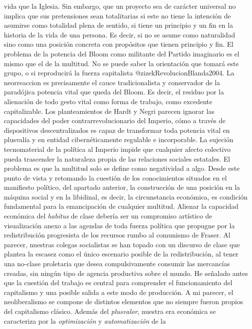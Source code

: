 \documentclass[
]{article}
\begin{document}
vida que la Iglesia. Sin embargo, que un proyecto sea de carácter
universal no implica que sus pretensiones sean totalitarias si este no
tiene la intención de asumirse como totalidad plena de sentido, si tiene
un principio y un fin en la historia de la vida de una persona. Es
decir, si no se asume como naturalidad sino como una posición concreta
con propósitos que tienen principio y fin. El problema de la potencia
del Bloom como militante del Partido imaginario es el mismo que el de la
multitud. No se puede saber la orientación que tomará este grupo, o si
reproducirá la fuerza capitalista @zizekRevolucionBlanda2004. La
neorreaccion es precisamente el cauce tradicionalista y conservador de
la paradójica potencia vital que queda del Bloom. Es decir, el residuo
por la alienación de todo gesto vital como forma de trabajo, como
excedente capitalizable. Los planteamientos de Hardt y Negri parecen
ignorar las capacidades del poder contrarrevolucionario del Imperio,
cómo a través de dispositivos descentralizados es capaz de transformar
toda potencia vital en plusvalía y en entidad cibernéticamente regulable
e incorporable. La sujeción tecnomaterial de la política al Imperio
impide que cualquier afecto colectivo pueda trascender la naturaleza
propia de las relaciones sociales estatales. El problema es que la
multitud solo se define como negatividad a algo. Desde este punto de
vista y retomando la cuestión de los conocimientos situados en el
manifiesto político, del apartado anterior, la construcción de una
posición en la máquina social y en la libidinal, es decir, la
circunstancia económica, es condición fundamental para la emancipación
de cualquier multitud. Alienar la capacidad económica del \emph{habitus}
de clase debería ser un compromiso artístico de visualización anexo a
las agendas de toda fuerza política que propugne por la redistribución
progresista de los recursos rumbo al comunismo de Fraser. Al parecer,
nuestras colegas socialistas se han topado con un discurso de clase que
plantea la escasez como el único escenario posible de la redistribución,
al tener una no-clase proletaria que desea compulsivamente consumir las
mercancías creadas, sin ningún tipo de agencia productiva sobre el
mundo. He señalado antes que la cuestión del trabajo es central para
comprender el funcionamiento del capitalismo y una posible salida a este
modo de producción. A mi parecer, el neoliberalismo se compone de
distintos elementos que no siempre fueron propios del capitalismo
clásico. Además del \emph{plusvalor}, nuestra era económica se
caracteriza por la \emph{optimización} y \emph{automatización} de la
\end{document}
